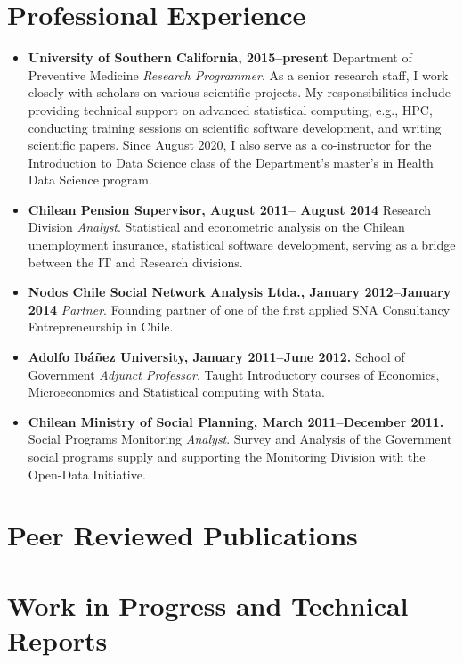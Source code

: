 \documentclass[letterpaper, 12pt]{article}
\begin{document}
\section*{Professional Experience}

\begin{itemize}
\item \textbf{University of Southern California, 2015--present} Department of Preventive Medicine \emph{Research Programmer}. As a senior research staff, I work closely with scholars on various scientific projects. My responsibilities include providing technical support on advanced statistical computing, e.g., HPC, conducting training sessions on scientific software development, and writing scientific papers. Since August 2020, I also serve as a co-instructor for the Introduction to Data Science class of the Department's master's in Health Data Science program.
\item \textbf{Chilean Pension Supervisor, August 2011-- August 2014} Research Division \emph{Analyst}. Statistical and econometric analysis on the Chilean unemployment insurance, statistical software development, serving as a bridge between the IT and Research divisions.
\item \textbf{Nodos Chile Social Network Analysis Ltda., January 2012--January 2014} \emph{Partner}.
Founding partner of one of the first applied SNA Consultancy Entrepreneurship in Chile.
\item \textbf{Adolfo Ib\'a\~nez University, January 2011--June 2012.} School of Government \emph{Adjunct Professor}.
Taught Introductory courses of Economics, Microeconomics and Statistical computing with Stata.
\item \textbf{Chilean Ministry of Social Planning, March 2011--December 2011.} Social Programs Monitoring \emph{Analyst}.
Survey and Analysis of the Government social programs supply and supporting the Monitoring Division with the Open-Data Initiative.
\end{itemize}

\section*{Peer Reviewed Publications}
\nocite{*}

\printbibliography[title=\vskip-20pt,keyword=published,resetnumbers=true]

\section*{Work in Progress and Technical Reports}
\end{document}
